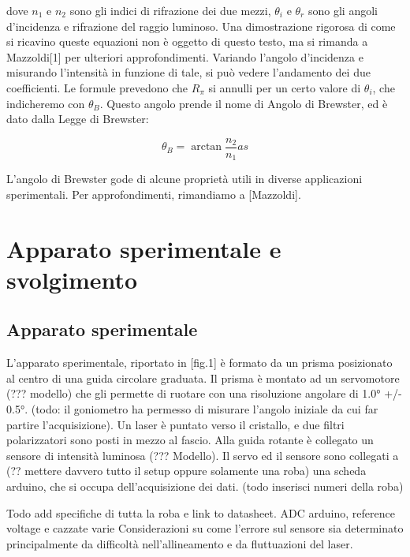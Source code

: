 \documentclass[12pt, a4paper, twoside]{article}
\begin{document}
  \noindent dove $n_1$ e $n_2$ sono gli indici di rifrazione dei due mezzi, $\theta_i$ e
  $\theta_r$ sono gli angoli d'incidenza e rifrazione del raggio luminoso.
  Una dimostrazione rigorosa di come si ricavino queste equazioni non è oggetto
  di questo testo, ma si rimanda a Mazzoldi[1] per ulteriori approfondimenti. %
  Variando l’angolo d'incidenza e misurando l’intensità in funzione di tale, si
  può vedere l’andamento dei due coefficienti.
  Le formule prevedono che $R_\pi$ si annulli per un certo valore di $\theta_i$,
  che indicheremo con $\theta_B$.
  Questo angolo prende il nome di Angolo di Brewster, ed è dato dalla Legge di Brewster:

  \begin{equation}
    \theta_B = \arctan{
      \frac {n_2} {n_1}as
    }\label{eq:Brewster's law}
  \end{equation}

 \noindent  L’angolo di Brewster gode di alcune proprietà utili in diverse applicazioni
  sperimentali.
  Per approfondimenti, rimandiamo a [Mazzoldi].



\section{Apparato sperimentale e svolgimento}\label{sec:apparato-sperimentale-e-svolgimento}
  \subsection{Apparato sperimentale}\label{subsec:apparato-sperimentale}
    L’apparato sperimentale, riportato in [fig.1] è formato da un prisma
    posizionato al centro di una guida circolare graduata. Il prisma è montato
    ad un servomotore (??? modello) che gli permette di ruotare con una
    risoluzione angolare di 1.0° +/- 0.5°. (todo: il goniometro ha permesso di
    misurare l’angolo iniziale da cui far partire l’acquisizione). Un laser è
    puntato verso il cristallo, e due filtri polarizzatori sono posti in mezzo
    al fascio. Alla guida rotante è collegato un sensore di intensità luminosa
    (??? Modello).
    Il servo ed il sensore sono collegati a (?? mettere davvero tutto il setup
    oppure solamente una roba) una scheda arduino, che si occupa dell’acquisizione
    dei dati.
    (todo inserisci numeri della roba)

    Todo add specifiche di tutta la roba e link to datasheet.
    ADC arduino, reference voltage e cazzate varie
    Considerazioni su come l’errore sul sensore sia determinato principalmente da difficoltà nell’allineamento e da fluttuazioni del laser.
\end{document}
